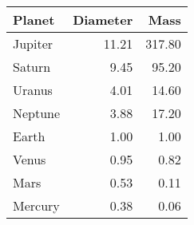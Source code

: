 \begin{table*}[tb]
{\begin{tabularx}{0.3\linewidth}{@{}Xrr@{}}
    \bottomrule
  \end{tabularx}
  \hspace{\fill}
  \begin{tabularx}{0.3\linewidth}{@{}Xrr@{}} %
    \toprule
    Planet & Diameter & Mass \\
    \midrule
    Jupiter & 11.21 & 317.80 \\
    Saturn & 9.45 & 95.20 \\
    Uranus & 4.01 & 14.60 \\
    Neptune & 3.88 & 17.20 \\
    Earth & 1.00 & 1.00 \\
    Venus & 0.95 & 0.82 \\
    Mars & 0.53 & 0.11 \\
    Mercury & 0.38 & 0.06 \\
    \bottomrule
  \end{tabularx}
  }
\end{table*}
